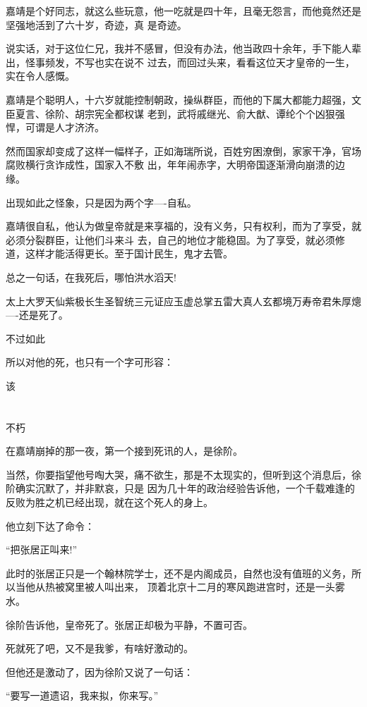 \documentclass[11pt,a4paper,onecolumn]{article}
\begin{document}
嘉靖是个好同志，就这么些玩意，他一吃就是四十年，且毫无怨言，而他竟然还是坚强地活到了六十岁，奇迹，真
是奇迹。

说实话，对于这位仁兄，我并不感冒，但没有办法，他当政四十余年，手下能人辈出，怪事频发，不写也实在说不
过去，而回过头来，看看这位天才皇帝的一生，实在令人感慨。

嘉靖是个聪明人，十六岁就能控制朝政，操纵群臣，而他的下属大都能力超强，文臣夏言、徐阶、胡宗宪全都权谋
老到，武将戚继光、俞大猷、谭纶个个凶狠强悍，可谓是人才济济。

然而国家却变成了这样一幅样子，正如海瑞所说，百姓穷困潦倒，家家干净，官场腐败横行贪诈成性，国家入不敷
出，年年闹赤字，大明帝国逐渐滑向崩溃的边缘。

出现如此之怪象，只是因为两个字----自私。

嘉靖很自私，他认为做皇帝就是来享福的，没有义务，只有权利，而为了享受，就必须分裂群臣，让他们斗来斗
去，自己的地位才能稳固。为了享受，就必须修道，这样才能活得更长。至于国计民生，鬼才去管。

总之一句话，在我死后，哪怕洪水滔天!

太上大罗天仙紫极长生圣智统三元证应玉虚总掌五雷大真人玄都境万寿帝君朱厚熜----还是死了。

不过如此

所以对他的死，也只有一个字可形容：

该

\section[\thesection]{}

不朽

在嘉靖崩掉的那一夜，第一个接到死讯的人，是徐阶。

当然，你要指望他号啕大哭，痛不欲生，那是不太现实的，但听到这个消息后，徐阶确实沉默了，并非默哀，只是
因为几十年的政治经验告诉他，一个千载难逢的反败为胜之机已经出现，就在这个死人的身上。

他立刻下达了命令：

``把张居正叫来!''

此时的张居正只是一个翰林院学士，还不是内阁成员，自然也没有值班的义务，所以当他从热被窝里被人叫出来，
顶着北京十二月的寒风跑进宫时，还是一头雾水。

徐阶告诉他，皇帝死了。张居正却极为平静，不置可否。

死就死了吧，又不是我爹，有啥好激动的。

但他还是激动了，因为徐阶又说了一句话：

``要写一道遗诏，我来拟，你来写。''
\end{document}
